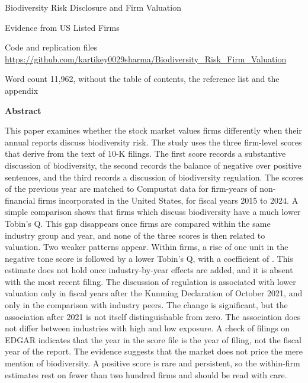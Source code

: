 \documentclass[12pt,a4paper]{article}
\newcommand{\wordcount}{11,962}
\begin{document}
\begin{center}
{\LARGE Biodiversity Risk Disclosure and Firm Valuation\par}
\vspace{6pt}
{\large Evidence from US Listed Firms\par}
\vspace{16pt}
{\small Code and replication files\\
\url{https://github.com/kartikey0029sharma/Biodiversity_Risk_Firm_Valuation}\par}
\vspace{8pt}
{\small Word count \wordcount{}, without the table of contents, the reference list and the appendix\par}
\vspace{22pt}
{\large\bfseries Abstract\par}
\end{center}

\begingroup{}
\noindent This paper examines whether the stock market values firms differently when their annual reports discuss biodiversity risk. The study uses the three firm-level scores that \citet{giglio2026} derive from the text of 10-K filings. The first score records a substantive discussion of biodiversity, the second records the balance of negative over positive sentences, and the third records a discussion of biodiversity regulation. The scores of the previous year are matched to Compustat data for \nFinal{} firm-years of \nFirmsFinal{} non-financial firms incorporated in the United States, for fiscal years 2015 to 2024. A simple comparison shows that firms which discuss biodiversity have a much lower Tobin's Q. This gap disappears once firms are compared within the same industry group and year, and none of the three scores is then related to valuation. Two weaker patterns appear. Within firms, a rise of one unit in the negative tone score is followed by a lower Tobin's Q, with a coefficient of \coefFAllNeg{}. This estimate does not hold once industry-by-year effects are added, and it is absent with the most recent filing. The discussion of regulation is associated with lower valuation only in fiscal years after the Kunming Declaration of October 2021, and only in the comparison with industry peers. The change is significant, but the association after 2021 is not itself distinguishable from zero. The association does not differ between industries with high and low exposure. A check of filings on EDGAR indicates that the year in the score file is the year of filing, not the fiscal year of the report. The evidence suggests that the market does not price the mere mention of biodiversity. A positive score is rare and persistent, so the within-firm estimates rest on fewer than two hundred firms and should be read with care.
\end{document}
